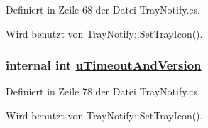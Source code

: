 Definiert in Zeile 68 der Datei Tray\-Notify.cs.

Wird benutzt von Tray\-Notify::Set\-Tray\-Icon().\hypertarget{structQbeTray_1_1TrayNotify_1_1NOTIFYICONDATA_QbeTray_1_1TrayNotify_1_1NOTIFYICONDATAo10}{
\subsubsection[uTimeoutAndVersion]{\setlength{\rightskip}{0pt plus 5cm}internal int \hyperlink{structQbeTray_1_1TrayNotify_1_1NOTIFYICONDATA_QbeTray_1_1TrayNotify_1_1NOTIFYICONDATAo10}{u\-Timeout\-And\-Version}}}
\label{structQbeTray_1_1TrayNotify_1_1NOTIFYICONDATA_QbeTray_1_1TrayNotify_1_1NOTIFYICONDATAo10}




Definiert in Zeile 78 der Datei Tray\-Notify.cs.

Wird benutzt von Tray\-Notify::Set\-Tray\-Icon().
